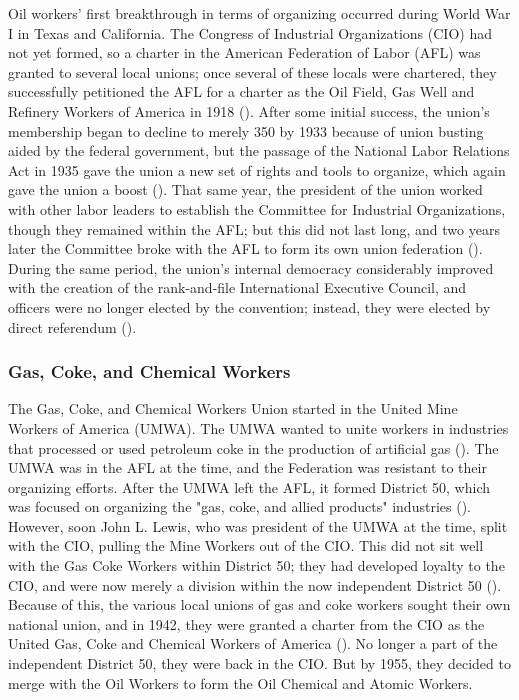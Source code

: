 \documentclass[12pt]{article}
\begin{document}
Oil workers’ first breakthrough in terms of organizing occurred during World War I in Texas and California. The Congress of Industrial Organizations (CIO) had not yet formed, so a charter in the American Federation of Labor (AFL) was granted to several local unions; once several of these locals were chartered, they successfully petitioned the AFL for a charter as the Oil Field, Gas Well and Refinery Workers of America in 1918 (\cite[48]{ocawFactBookOil1960}). After some initial success, the union’s membership began to decline to merely 350 by 1933 because of union busting aided by the federal government, but the passage of the National Labor Relations Act in 1935 gave the union a new set of rights and tools to organize, which again gave the union a boost (\cite[49]{ocawFactBookOil1960}). That same year, the president of the union worked with other labor leaders to establish the Committee for Industrial Organizations, though they remained within the AFL; but this did not last long, and two years later the Committee broke with the AFL to form its own union federation (\cite[49]{ocawFactBookOil1960}). During the same period, the union’s internal democracy considerably improved with the creation of the rank-and-file International Executive Council, and officers were no longer elected by the convention; instead, they were elected by direct referendum (\cite[49--50]{ocawFactBookOil1960}).

\subsubsection{Gas, Coke, and Chemical Workers}

The Gas, Coke, and Chemical Workers Union started in the United Mine Workers of America (UMWA). The UMWA wanted to unite workers in industries that processed or used petroleum coke in the production of artificial gas (\cite[50]{ocawFactBookOil1960}). The UMWA was in the AFL at the time, and the Federation was resistant to their organizing efforts. After the UMWA left the AFL, it formed District 50, which was focused on organizing the "gas, coke, and allied products" industries (\cite[50--51]{ocawFactBookOil1960}). However, soon John L. Lewis, who was president of the UMWA at the time, split with the CIO, pulling the Mine Workers out of the CIO. This did not sit well with the Gas Coke Workers within District 50; they had developed loyalty to the CIO, and were now merely a division within the now independent District 50 (\cite[51]{ocawFactBookOil1960}). Because of this, the various local unions of gas and coke workers sought their own national union, and in 1942, they were granted a charter from the CIO as the United Gas, Coke and Chemical Workers of America (\cite[51]{ocawFactBookOil1960}). No longer a part of the independent District 50, they were back in the CIO.  But by 1955, they decided to merge with the Oil Workers to form the Oil Chemical and Atomic Workers.
\end{document}
